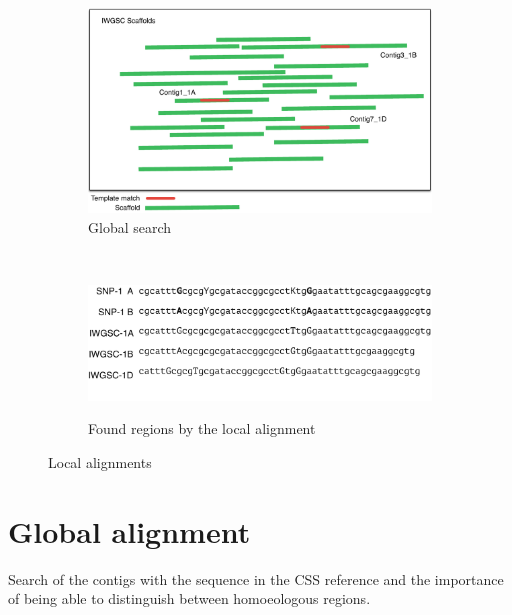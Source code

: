 \begin{figure}
    \centering
    \begin{subfigure}[b]{0.4\textwidth}
        \includegraphics[width=1\textwidth]{PolyMarker/Figures/scaffoldsSearch.pdf}
        \caption{Global search}
        \label{fig:poly:globalSearch}
    \end{subfigure}
    ~ %
    \begin{subfigure}[b]{0.4\textwidth}
        \raisebox{10mm} { \includegraphics[width=1\textwidth]{PolyMarker/Figures/scaffoldsFound.pdf} }
        \caption{Found regions by the local alignment}
        \label{fig:poly:globalFound}
    \end{subfigure}
    \caption{Local alignments}\label{fig:global}
\end{figure}


\section{Global alignment} 
Search of the contigs with the sequence in the CSS reference and the importance of being able to distinguish between homoeologous regions. 



